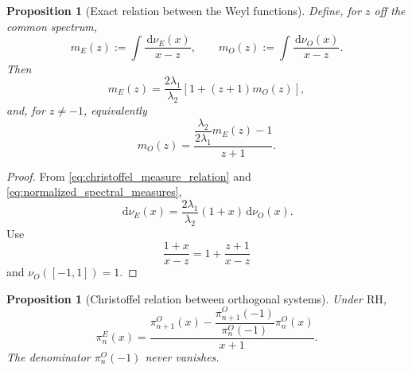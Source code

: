 \documentclass[preprint,12pt]{elsarticle}
\numberwithin{equation}{section}
\theoremstyle{plain}
\newtheorem{proposition}[theorem]{Proposition}
\theoremstyle{definition}
\theoremstyle{remark}
\newcommand{\RH}{\mathrm{RH}}
\newcommand{\dd}{\,\mathrm d}
\begin{document}
\begin{proposition}[Exact relation between the Weyl functions]
\label{prop:Weyl_function_relation}
Define, for $z$ off the common spectrum,
\begin{equation}
m_E(z):=\int\frac{\dd\nu_E(x)}{x-z},
\qquad
m_O(z):=\int\frac{\dd\nu_O(x)}{x-z}.
\label{eq:Weyl_functions_definition}
\end{equation}
Then
\begin{equation}
m_E(z)
=\frac{2\lambda_1}{\lambda_2}
\left[1+(z+1)m_O(z)\right],
\label{eq:Weyl_E_from_O}
\end{equation}
and, for $z\ne-1$, equivalently
\begin{equation}
m_O(z)
=\frac{\dfrac{\lambda_2}{2\lambda_1}m_E(z)-1}{z+1}.
\label{eq:Weyl_O_from_E}
\end{equation}
\end{proposition}

\begin{proof}
From \eqref{eq:christoffel_measure_relation} and \eqref{eq:normalized_spectral_measures},
\begin{equation}
\dd\nu_E(x)
=\frac{2\lambda_1}{\lambda_2}(1+x)\dd\nu_O(x).
\label{eq:normalized_christoffel_relation}
\end{equation}
Use
\begin{equation}
\frac{1+x}{x-z}=1+\frac{z+1}{x-z}
\label{eq:Weyl_fraction_identity}
\end{equation}
and $\nu_O([-1,1])=1$.
\end{proof}

\begin{proposition}[Christoffel relation between orthogonal systems]
\label{prop:christoffel_polynomials}
Under $\RH$,
\begin{equation}
\pi_n^E(x)=
\frac{
\pi_{n+1}^O(x)-
\dfrac{\pi_{n+1}^O(-1)}{\pi_n^O(-1)}\pi_n^O(x)
}{x+1}.
\label{eq:christoffel_polynomial_formula}
\end{equation}
The denominator $\pi_n^O(-1)$ never vanishes.
\end{proposition}
\end{document}
